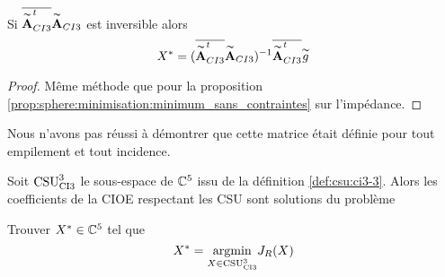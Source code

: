     \begin{prop}
      Si \(\conj{\tilde{\mA}_{CI3}^t}\tilde{\mA}_{CI3}\) est inversible alors
      \begin{equation*}
        X^* = (\conj{\tilde{\mA}_{CI3}^t}\tilde{\mA}_{CI3})^{-1}\conj{\tilde{\mA}_{CI3}^t}\tilde{g}
      \end{equation*}
    \end{prop}
    \begin{proof}
      Même méthode que pour la proposition \ref{prop:sphere:minimisation:minimum_sans_contraintes} sur l'impédance.
    \end{proof}

    Nous n'avons pas réussi à démontrer que cette matrice était définie pour tout empilement et tout incidence.

    \begin{thm}

      Soit \(\CSU[3]{CI3}\) le sous-espace de \(\CC^5\) issu de la définition \ref{def:csu:ci3-3}.
      Alors les coefficients de la CIOE respectant les CSU sont solutions du problème

      Trouver \(X^* \in \CC^5\) tel que
      \begin{equation*}
        X^* = \argmin{X\in \CSU[3]{CI3}} J_R(X)
      \end{equation*}
    \end{thm}

    